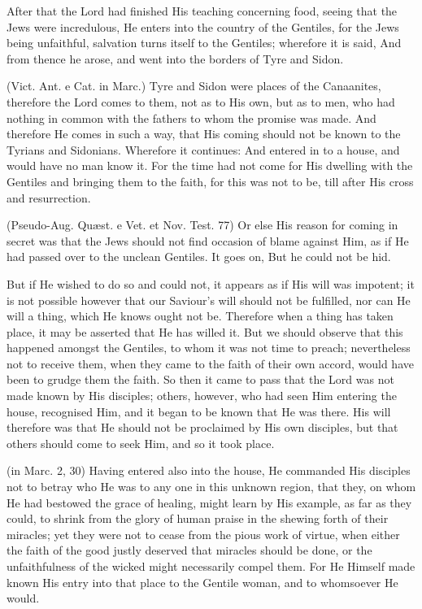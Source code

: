  After that the Lord had finished His teaching concerning food, seeing that the Jews were incredulous, He enters into the country of the Gentiles, for the Jews being unfaithful, salvation turns itself to the Gentiles; wherefore it is said, And from thence he arose, and went into the borders of Tyre and Sidon.

 (Vict. Ant. e Cat. in Marc.) Tyre and Sidon were places of the Canaanites, therefore the Lord comes to them, not as to His own, but as to men, who had nothing in common with the fathers to whom the promise was made. And therefore He comes in such a way, that His coming should not be known to the Tyrians and Sidonians. Wherefore it continues: And entered in to a house, and would have no man know it. For the time had not come for His dwelling with the Gentiles and bringing them to the faith, for this was not to be, till after His cross and resurrection.

 (Pseudo-Aug. Quæst. e Vet. et Nov. Test. 77) Or else His reason for coming in secret was that the Jews should not find occasion of blame against Him, as if He had passed over to the unclean Gentiles. It goes on, But he could not be hid.

 But if He wished to do so and could not, it appears as if His will was impotent; it is not possible however that our Saviour’s will should not be fulfilled, nor can He will a thing, which He knows ought not be. Therefore when a thing has taken place, it may be asserted that He has willed it. But we should observe that this happened amongst the Gentiles, to whom it was not time to preach; nevertheless not to receive them, when they came to the faith of their own accord, would have been to grudge them the faith. So then it came to pass that the Lord was not made known by His disciples; others, however, who had seen Him entering the house, recognised Him, and it began to be known that He was there. His will therefore was that He should not be proclaimed by His own disciples, but that others should come to seek Him, and so it took place.

 (in Marc. 2, 30) Having entered also into the house, He commanded His disciples not to betray who He was to any one in this unknown region, that they, on whom He had bestowed the grace of healing, might learn by His example, as far as they could, to shrink from the glory of human praise in the shewing forth of their miracles; yet they were not to cease from the pious work of virtue, when either the faith of the good justly deserved that miracles should be done, or the unfaithfulness of the wicked might necessarily compel them. For He Himself made known His entry into that place to the Gentile woman, and to whomsoever He would.

